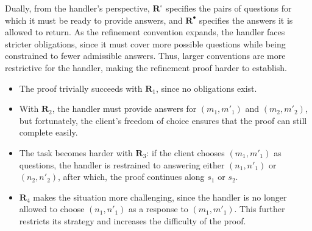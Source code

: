 Dually, from the handler's perspective,
$\mathbf{R}^\circ$ specifies the pairs of questions
for which it must be ready to provide answers,
and $\mathbf{R}^\bullet$ specifies the answers
it is allowed to return.
As the refinement convention expands,
the handler faces stricter obligations,
since it must cover more possible questions
while being constrained to fewer admissible answers.
Thus, larger conventions are more restrictive
for the handler,
making the refinement proof harder to establish.

\begin{itemize}
  \item The proof trivially succeeds with $\mathbf{R}_1$,
    since no obligations exist.
  \item With $\mathbf{R}_2$,
    the handler must provide answers for
    $(m_1, m'_1)$ and $(m_2, m'_2)$,
    but fortunately,
    the client's freedom of choice ensures
    that the proof can still complete easily.
  \item The task becomes harder with $\mathbf{R}_3$:
    if the client chooses $(m_1, m'_1)$ as questions,
    the handler is restrained to answering either $(n_1, n'_1)$ or $(n_2, n'_2)$,
    after which,
    the proof continues along $s_1$ or $s_2$.
  \item $\mathbf{R}_4$ makes the situation more challenging,
    since the handler is no longer allowed
    to choose $(n_1, n'_1)$
    as a response to $(m_1, m'_1)$.
    This further restricts its strategy
    and increases the difficulty of the proof.
\end{itemize}

